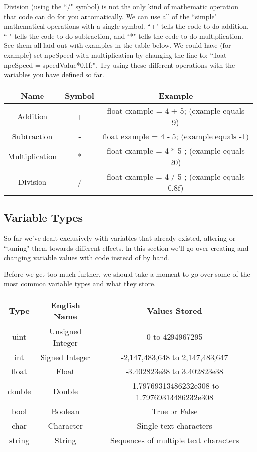 \documentclass{article}
\begin{document}
Division (using the ``/" symbol) is not the only kind of mathematic operation that code can do for you automatically. We can use all of the ``simple" mathematical operations with a single symbol. ``+" tells the code to do addition, ``-" tells the code to do subtraction, and ``*" tells the code to do multiplication. See them all laid out with examples in the table below. We could have (for example) set npcSpeed with multiplication by changing the line to: ``float npcSpeed = speedValue*0.1f;". Try using these different operations with the variables you have defined so far.

\begin{center}
\begin{tabular}{ |c|c|c| } 
\hline
Name & Symbol & Example \\ 
\hline
Addition & + &  float example = 4 + 5; (example equals 9)\\
\hline
Subtraction & - &  float example = 4 - 5; (example equals -1)\\
\hline
Multiplication & * &  float example = 4 * 5 ; (example equals 20)\\
\hline
Division & / &  float example = 4 / 5 ; (example equals 0.8f)\\
\hline
\end{tabular}
\end{center}
 
 
\subsection{Variable Types}

So far we've dealt exclusively with variables that already existed, altering or ``tuning" them towards different effects. In this section we'll go over creating and changing variable values with code instead of by hand. 

Before we get too much further, we should take a moment to go over some of the most common variable types and what they store. 

\begin{center}
\begin{tabular}{ |c|c|c| } 
 \hline
 Type & English Name & Values Stored \\ 
  \hline
 uint & Unsigned Integer & 0 to 4294967295 \\ 
  \hline
 int & Signed Integer & -2,147,483,648 to 2,147,483,647 \\ 
 \hline
 float & Float & -3.402823e38 to 3.402823e38 \\ 
 \hline
  double & Double & -1.79769313486232e308 to 1.79769313486232e308 \\ 
 \hline
  bool & Boolean & True or False \\ 
 \hline
  char & Character & Single text characters \\ 
 \hline
  string & String & Sequences of multiple text characters \\ 
 \hline
\end{tabular}
\end{center}
\end{document}
